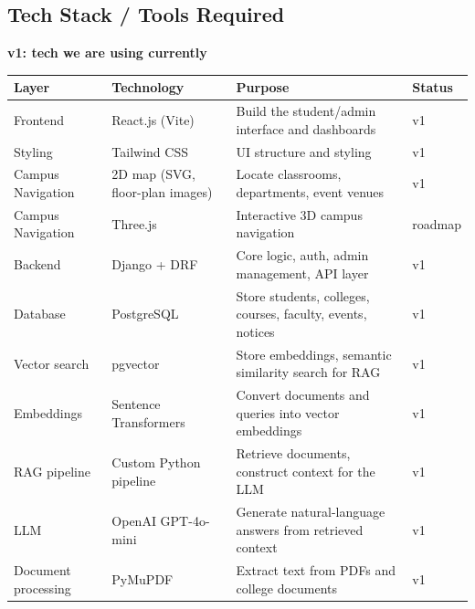 \documentclass[11pt,a4paper]{article}
\begin{document}
\subsection{Tech Stack / Tools Required}
\textbf{v1: tech we are using currently}

\vspace{0.3cm}

\renewcommand{\arraystretch}{1.2}

\begin{longtable}{|p{2.5cm}|p{3.5cm}|p{6cm}|p{1.5cm}|}

\hline
\textbf{Layer} &
\textbf{Technology} &
\textbf{Purpose} &
\textbf{Status} \\
\hline

Frontend &
React.js (Vite) &
Build the student/admin interface and dashboards &
v1 \\
\hline

Styling &
Tailwind CSS &
UI structure and styling &
v1 \\
\hline

Campus Navigation &
2D map (SVG, floor-plan images) &
Locate classrooms, departments, event venues &
v1 \\
\hline

Campus Navigation &
Three.js &
Interactive 3D campus navigation &
roadmap \\
\hline

Backend &
Django + DRF &
Core logic, auth, admin management, API layer &
v1 \\
\hline

Database &
PostgreSQL &
Store students, colleges, courses, faculty, events, notices &
v1 \\
\hline

Vector search &
pgvector &
Store embeddings, semantic similarity search for RAG &
v1 \\
\hline

Embeddings &
Sentence Transformers &
Convert documents and queries into vector embeddings &
v1 \\
\hline

RAG pipeline &
Custom Python pipeline &
Retrieve documents, construct context for the LLM &
v1 \\
\hline

LLM &
OpenAI GPT-4o-mini &
Generate natural-language answers from retrieved context &
v1 \\
\hline

Document processing &
PyMuPDF &
Extract text from PDFs and college documents &
v1 \\
\hline


\end{longtable}
\end{document}
